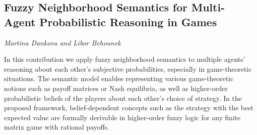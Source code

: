\documentclass[../booklet.tex]{subfiles}
\begin{document}
\subsection[Fuzzy Neighborhood Semantics for Multi-Agent Probabilistic Reasoning in Games. {\it Martina Dankova and Libor Behounek}]{Fuzzy Neighborhood Semantics for Multi-Agent Probabilistic Reasoning in Games}
 

\begin{center}
  {\it Martina Dankova and Libor Behounek}
\end{center}



In this contribution we apply fuzzy neighborhood semantics to multiple agents' reasoning about each other's subjective probabilities, especially in game-theoretic situations. The semantic model enables representing various game-theoretic notions such as payoff matrices or Nash equilibria, as well as higher-order probabilistic beliefs of the players about each other's choice of strategy. In the proposed framework, belief-dependent concepts such as the strategy with the best expected value are formally derivable in higher-order fuzzy logic for any finite matrix game with rational payoffs.

\end{document}
